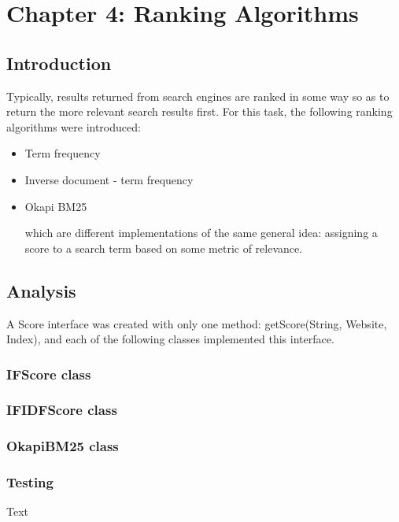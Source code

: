 \chapter{Chapter 4: Ranking Algorithms}

\section{Introduction}
Typically, results returned from search engines are ranked in some way so as to return the more relevant search results first. For this task,  the following ranking algorithms were introduced:

\begin{itemize}

\item Term frequency

\item Inverse document - term frequency

\item Okapi BM25

which are different implementations of the same general idea: assigning a score to a search term based on some metric of relevance.

\end{itemize}

\section{Analysis}
A Score interface was created with only one method: getScore(String, Website, Index), and each of the following classes implemented this interface.
 
\subsection{IFScore class}


\subsection{IFIDFScore class}

\subsection{OkapiBM25 class}


\subsection{Testing}
Text\\
